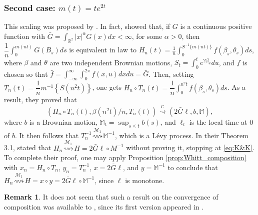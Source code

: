 \documentclass[final]{amsart}
\theoremstyle{definition}
\newtheorem{rem}{Remark}[section]
\numberwithin{equation}{section}
\def\disp{\displaystyle}
\newcommand{\dM}{\ensuremath{\mathbb{M}}}
\newcommand{\dR}{\ensuremath{\mathbb{R}}}
\newcommand{\cM}{\ensuremath{\mathcal{M}}}
\begin{document}
\subsubsection{Second case: $m(t)=te^{2t}$}
This scaling was proposed by \citet{Kasahara/Kotani:1979}. In fact,
\citet{Kasahara/Kotani:1979} showed that, if $G$ is a continuous positive function with $\bar G = \int_{\dR^2}|x|^\alpha G(x)dx < \infty $, for some $\alpha>0$, then
$\dfrac{1}{n}\int_0^{m(nt)}G(B_s)ds$ is equivalent in law to
$\disp
H_n(t) = \frac{1}{n}\int_0^{S^{-1}\{m(nt)\}} f(\beta_s,\theta_s) ds$,
where $\beta$ and $\theta$ are two independent Brownian motions, $S_t = \int_0^t e^{2\beta_u}
du$, and $f$ is chosen so that $\bar f = \int_{-\infty}^\infty \int_0^{2\pi}f(x,u)dx du = \bar G$. Then, setting
$T_n(t) = \dfrac{1}{n}m^{-1}\left\{S\left(n^2 t\right)\right\}$,
one gets $H_n\circ T_n(t) = \dfrac{1}{n}\int_0^{n^2 t}f(\beta_s,\theta_s) ds$.
As a result, they proved that
\begin{equation}\label{eq:K&K}
\left(H_n\circ T_n(t), \beta(n^2t)/n,T_n(t)\right)\stackrel{\mathcal{C}}{\rightsquigarrow} \left(2\bar G \ell, b,\dM\right),
\end{equation}
where $b$ is a Brownian motion, $\dM_t = \disp\sup_{s\le t}b(s)$, and $\ell_t $ is the local time at $0$ of $b$.
It then follows that $T_n^{-1}\stackrel{\cM_1}{\rightsquigarrow}\dM^{-1}$, which is a L\'evy process. In their Theorem 3.1,
 \citet{Kasahara/Kotani:1979} stated that $H_n\stackrel{\cM_1}{\rightsquigarrow}H = 2 \bar G \ell \circ M^{-1}$ without proving it,
 stopping at \eqref{eq:K&K}.  To complete their proof, one may apply Proposition \ref{prop:Whitt_composition}
 with $x_n = H_n\circ T_n$, $y_n = T_n^{-1}$, $x = 2\bar G \ell$, and $y= \dM^{-1}$ to conclude that
 $H_n\stackrel{\cM_1}{\rightsquigarrow}H = x\circ y = 2\bar G \ell\circ \dM^{-1}$, since $\ell$ is monotone.
\begin{rem}
It does not seem that such a  result on the convergence of composition was available to \citet{Kasahara/Kotani:1979},
since its first version appeared in \cite[Proposition 3.1]{Yamazaki:1992}.
\end{rem}
\end{document}
